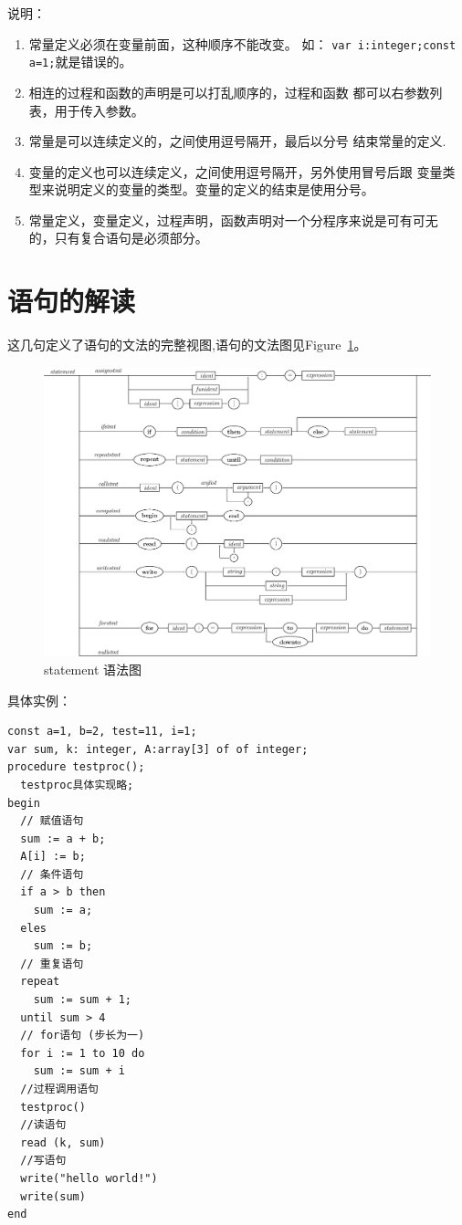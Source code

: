 说明：
\begin{enumerate}
	\item 常量定义必须在变量前面，这种顺序不能改变。
		如： \verb|var i:integer;const a=1;|就是错误的。
	\item 相连的过程和函数的声明是可以打乱顺序的，过程和函数
		都可以右参数列表，用于传入参数。
	\item 常量是可以连续定义的，之间使用逗号隔开，最后以分号
		结束常量的定义.
	\item 变量的定义也可以连续定义，之间使用逗号隔开，另外使用冒号后跟
		变量类型来说明定义的变量的类型。变量的定义的结束是使用分号。
	\item 常量定义，变量定义，过程声明，函数声明对一个分程序来说是可有可无
		的，只有复合语句是必须部分。
\end{enumerate}
\section{语句的解读}









这几句定义了语句的文法的完整视图,语句的文法图见Figure~\ref{statement}。
\begin{figure}[!h]
\begin{center}
    \includegraphics[scale=.6]{Figures/statement.eps}
\end{center}
\caption{statement 语法图}
\label{statement}
\end{figure}
具体实例：
\begin{verbatim}
const a=1, b=2, test=11, i=1;
var sum, k: integer, A:array[3] of of integer;
procedure testproc();
  testproc具体实现略;
begin
  // 赋值语句
  sum := a + b;
  A[i] := b;
  // 条件语句
  if a > b then
    sum := a;
  eles
    sum := b;
  // 重复语句
  repeat
    sum := sum + 1;
  until sum > 4
  // for语句 (步长为一)
  for i := 1 to 10 do
    sum := sum + i
  //过程调用语句
  testproc()
  //读语句
  read (k, sum)
  //写语句
  write("hello world!")
  write(sum)
end
\end{verbatim}
